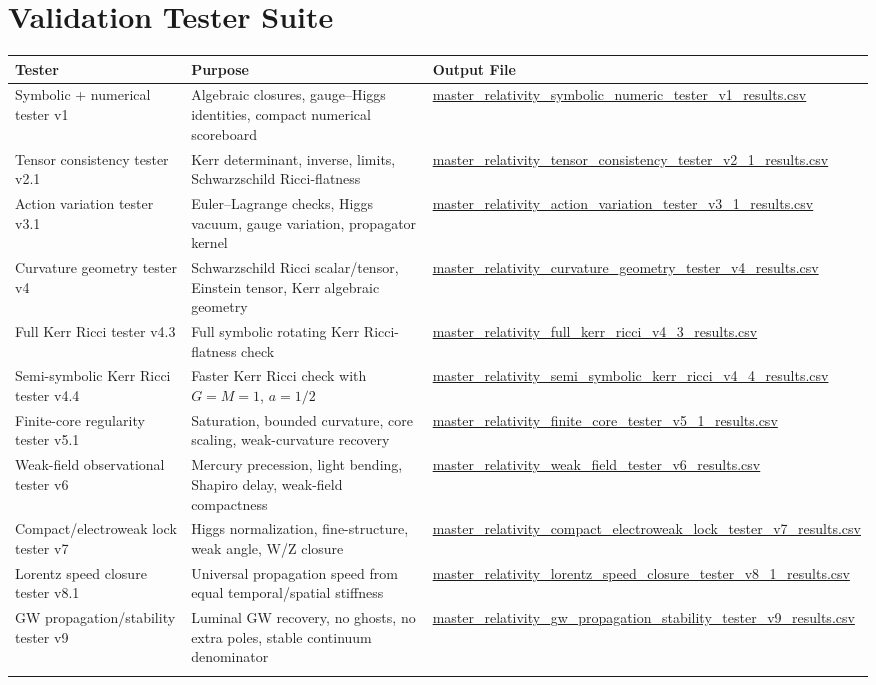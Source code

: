 \documentclass[11pt]{article}
\begin{document}
\section{Validation Tester Suite}
\begin{longtable}{>{\raggedright\arraybackslash}p{} >{\raggedright\arraybackslash}p{} >{\raggedright\arraybackslash\small}p{}}
\toprule
\textbf{Tester} & \textbf{Purpose} & \textbf{Output File} \\
\midrule
\endhead
Symbolic + numerical tester v1 & Algebraic closures, gauge--Higgs identities, compact numerical scoreboard & \url{master_relativity_symbolic_numeric_tester_v1_results.csv} \\ \addlinespace
Tensor consistency tester v2.1 & Kerr determinant, inverse, limits, Schwarzschild Ricci-flatness & \url{master_relativity_tensor_consistency_tester_v2_1_results.csv} \\ \addlinespace
Action variation tester v3.1 & Euler--Lagrange checks, Higgs vacuum, gauge variation, propagator kernel & \url{master_relativity_action_variation_tester_v3_1_results.csv} \\ \addlinespace
Curvature geometry tester v4 & Schwarzschild Ricci scalar/tensor, Einstein tensor, Kerr algebraic geometry & \url{master_relativity_curvature_geometry_tester_v4_results.csv} \\ \addlinespace
Full Kerr Ricci tester v4.3 & Full symbolic rotating Kerr Ricci-flatness check & \url{master_relativity_full_kerr_ricci_v4_3_results.csv} \\ \addlinespace
Semi-symbolic Kerr Ricci tester v4.4 & Faster Kerr Ricci check with $G=M=1$, $a=1/2$ & \url{master_relativity_semi_symbolic_kerr_ricci_v4_4_results.csv} \\ \addlinespace
Finite-core regularity tester v5.1 & Saturation, bounded curvature, core scaling, weak-curvature recovery & \url{master_relativity_finite_core_tester_v5_1_results.csv} \\ \addlinespace
Weak-field observational tester v6 & Mercury precession, light bending, Shapiro delay, weak-field compactness & \url{master_relativity_weak_field_tester_v6_results.csv} \\
Compact/electroweak lock tester v7 & Higgs normalization, fine-structure, weak angle, W/Z closure & \url{master_relativity_compact_electroweak_lock_tester_v7_results.csv} \\ \addlinespace
Lorentz speed closure tester v8.1 & Universal propagation speed from equal temporal/spatial stiffness & \url{master_relativity_lorentz_speed_closure_tester_v8_1_results.csv} \\ \addlinespace
GW propagation/stability tester v9 & Luminal GW recovery, no ghosts, no extra poles, stable continuum denominator & \url{master_relativity_gw_propagation_stability_tester_v9_results.csv} \\ \addlinespace

\end{longtable}
\bottomrule
\end{document}
